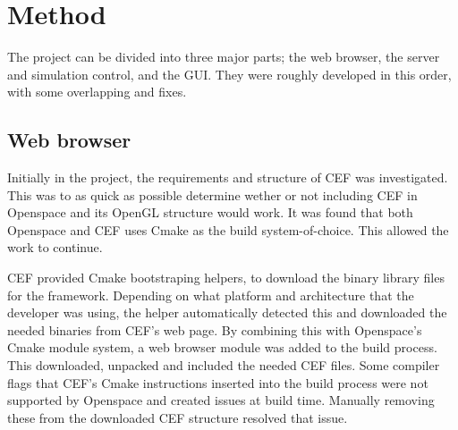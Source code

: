 
\chapter{Method}
\label{cha:method}



The project can be divided into three major parts; the web browser, the server and simulation control, and the GUI. They were roughly developed in this order, with some overlapping and fixes.

\section{Web browser}

Initially in the project, the requirements and structure of CEF was investigated. This was to as quick as possible determine wether or not including CEF in Openspace and its OpenGL structure would work. It was found that both Openspace and CEF uses Cmake as the build system-of-choice. This allowed the work to continue.

CEF provided Cmake bootstraping helpers, to download the binary library files for the framework. Depending on what platform and architecture that the developer was using, the helper automatically detected this and downloaded the needed binaries from CEF's web page. By combining this with Openspace's Cmake module system, a web browser module was added to the build process. This downloaded, unpacked and included the needed CEF files. Some compiler flags that CEF's Cmake instructions inserted into the build process were not supported by Openspace and created issues at build time. Manually removing these from the downloaded CEF structure resolved that issue.

